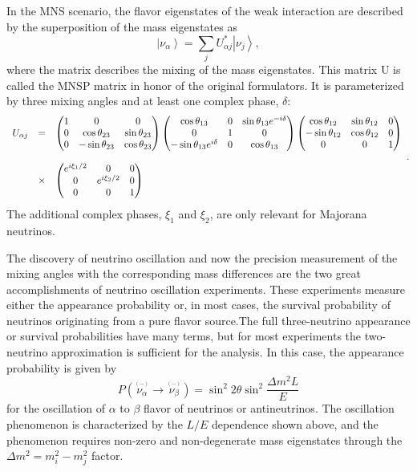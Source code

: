 In the MNS scenario, the flavor eigenstates of the weak interaction are described by the superposition of the mass eigenstates as
\begin{equation}
\left| \nu_{\alpha} \right> = \sum_{j} U^*_{\alpha j} \left| \nu_{j}\right>,
\end{equation}
where the matrix describes the mixing of the mass eigenstates. This matrix U is called the MNSP matrix in honor of the original formulators. It is parameterized by three mixing angles and at least one complex phase, $\delta$:
\begin{equation}
\label{eq:osc_matrix}
\begin{array}{l c l}
U_{\alpha j} & = &
\begin{pmatrix}
1 & 0 & 0 \\
0 & \cos \theta_{23} & \sin \theta_{23}\\ 
0 & -\sin \theta_{23} & \cos \theta_{23} 
\end{pmatrix}
\begin{pmatrix}
\cos \theta_{13} & 0 &  \sin \theta_{13}e^{-i\delta}\\
0 & 1 & 0\\ 
-\sin \theta_{13}e^{i\delta} & 0 & \cos \theta_{13}
\end{pmatrix}
\begin{pmatrix} 
\cos \theta_{12} & \sin \theta_{12}  & 0\\ 
-\sin \theta_{12} & \cos \theta_{12}  & 0\\
0 & 0 & 1
\end{pmatrix} 
\\
\\
 & \times & \begin{pmatrix}
 e^{i\xi_{1}/2} & 0 & 0\\ 
0 & e^{i\xi_{2}/2} & 0\\ 
0 & 0 & 1
\end{pmatrix}
\end{array}.
\end{equation}
The additional complex phases,  $\xi_1$ and $\xi_2$, are only relevant for Majorana neutrinos. 

The discovery of neutrino oscillation and now the precision measurement of the mixing angles with the corresponding mass differences are the two great accomplishments of neutrino oscillation experiments. These experiments measure either the appearance probability or, in most cases, the survival probability of neutrinos originating from a pure flavor source.The full three-neutrino appearance or survival probabilities have many terms, but for most experiments the two-neutrino approximation is sufficient for the analysis. In this case, the appearance probability is given by
\begin{equation}
\label{Eq:Prob2Nu}
P(\overset{_{(-)}}{\nu_\alpha} \rightarrow \overset{_{(-)}}{\nu_\beta}) = \sin^{2} 2 \theta \sin^{2} \frac{\Delta m^{2} L}{ E}
\end{equation}
for the oscillation of $\alpha$ to $\beta$ flavor of neutrinos or antineutrinos.  The oscillation phenomenon is characterized by the $L/E$ dependence shown above, and the phenomenon requires non-zero and non-degenerate mass eigenstates through the $\Delta m^{2} = m_{i}^2 - m_{j}^2$ factor.


